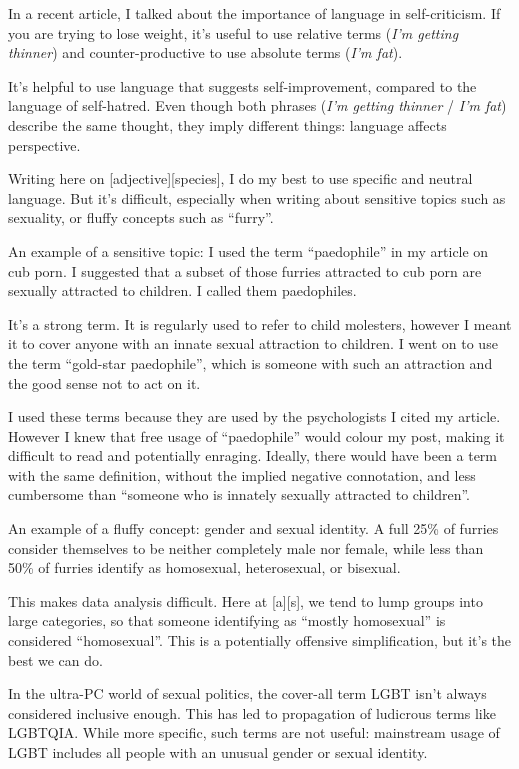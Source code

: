
In a recent article, I talked about the importance of language in self-criticism. If you are trying to lose weight, it's useful to use relative terms (\textit{I'm getting thinner}) and counter-productive to use absolute terms (\textit{I'm fat}).

It's helpful to use language that suggests self-improvement, compared to the language of self-hatred. Even though both phrases (\textit{I'm getting thinner} / \textit{I'm fat}) describe the same thought, they imply different things: language affects perspective.

Writing here on [adjective][species], I do my best to use specific and neutral language. But it's difficult, especially when writing about sensitive topics such as sexuality, or fluffy concepts such as ``furry''.

An example of a sensitive topic: I used the term ``paedophile'' in my article on cub porn. I suggested that a subset of those furries attracted to cub porn are sexually attracted to children. I called them paedophiles.

It's a strong term. It is regularly used to refer to child molesters, however I meant it to cover anyone with an innate sexual attraction to children. I went on to use the term ``gold-star paedophile'', which is someone with such an attraction and the good sense not to act on it.

I used these terms because they are used by the psychologists I cited my article. However I knew that free usage of ``paedophile'' would colour my post, making it difficult to read and potentially enraging. Ideally, there would have been a term with the same definition, without the implied negative connotation, and less cumbersome than ``someone who is innately sexually attracted to children''.

An example of a fluffy concept: gender and sexual identity. A full 25\% of furries consider themselves to be neither completely male nor female, while less than 50\% of furries identify as homosexual, heterosexual, or bisexual.

This makes data analysis difficult. Here at [a][s], we tend to lump groups into large categories, so that someone identifying as ``mostly homosexual'' is considered ``homosexual''. This is a potentially offensive simplification, but it's the best we can do.

In the ultra-PC world of sexual politics, the cover-all term LGBT isn't always considered inclusive enough. This has led to propagation of ludicrous terms like LGBTQIA. While more specific, such terms are not useful: mainstream usage of LGBT includes all people with an unusual gender or sexual identity.

